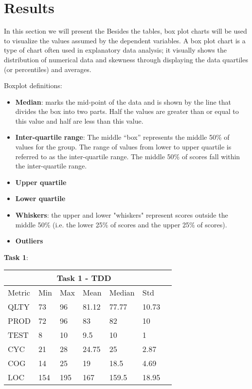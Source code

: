 \section{Results}
In this section we will present the 
Besides the tables, box plot charts will be used to visualize the values assumed by the dependent variables.
A box plot chart is a type of chart often used in explanatory data analysis; it visually shows the distribution of numerical data and skewness through displaying the data quartiles (or percentiles) and averages.

Boxplot definitions:
\begin{itemize}
    \item \textbf{Median}: marks the mid-point of the data and is shown by the line that divides the box into two parts. Half the values are greater than or equal to this value and half are less than this value.
    \item \textbf{Inter-quartile range}: The middle “box” represents the middle 50\% of values for the group. The range of values from lower to upper quartile is referred to as the inter-quartile range. The middle 50\% of scores fall within the inter-quartile range.
    \item \textbf{Upper quartile}
    \item \textbf{Lower quartile}
    \item \textbf{Whiskers}: the upper and lower "whiskers" represent scores outside the middle 50\% (i.e. the lower 25\% of scores and the upper 25\% of scores).
    \item \textbf{Outliers}
\end{itemize}

\textbf{Task 1}:

\noindent
\begin{tabular}{ |p{2cm}||p{1.6cm}|p{1.6cm}|p{1.6cm}|p{1.6cm}|p{1.6cm}|p{1.6cm}| }
    \hline
        \multicolumn{6}{|c|}{Task 1 - TDD} \\
    \hline
        Metric & Min & Max & Mean & Median & Std \\
    \hline
        QLTY & 73 & 96 & 81.12 & 77.77 & 10.73 \\
        PROD & 72 & 96 & 83 & 82 & 10 \\
        TEST & 8 & 10 & 9.5 & 10 & 1 \\
        CYC & 21 & 28 & 24.75 & 25 & 2.87 \\
        COG & 14 & 25 & 19 & 18.5 & 4.69 \\
        LOC & 154 & 195 & 167 & 159.5 & 18.95 \\
    \hline
\end{tabular}

